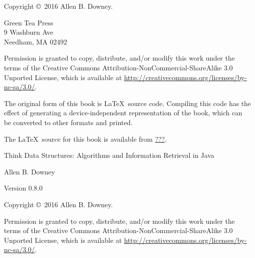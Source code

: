 \documentclass[12pt]{book}
\newcommand{\thetitle}{Think Data Structures}
\newcommand{\thesubtitle}{Algorithms and Information Retrieval in Java}
\newcommand{\theauthors}{Allen B. Downey}
\newcommand{\theversion}{0.8.0}
\theoremstyle{exercise}
\begin{document}
\begin{latexonly}
\newpage
\thispagestyle{empty}

Copyright \copyright ~2016 \theauthors.

\vspace{0.2in}

\begin{flushleft}
Green Tea Press \\
9 Washburn Ave \\
Needham, MA 02492
\end{flushleft}

Permission is granted to copy, distribute, and/or modify this work under the terms of the Creative Commons Attribution-NonCommercial-ShareAlike 3.0 Unported License, which is available at \url{http://creativecommons.org/licenses/by-nc-sa/3.0/}.

The original form of this book is \LaTeX\ source code.
Compiling this code has the effect of generating a device-independent representation of the book, which can be converted to other formats and printed.

The \LaTeX\ source for this book is available from
\url{???}.


\cleardoublepage
\setcounter{tocdepth}{1}
\tableofcontents

\end{latexonly}


\begin{htmlonly}

\vspace{1em}

{\Large \thetitle: \thesubtitle}

{\large \theauthors}

Version \theversion

\vspace{1em}

Copyright \copyright ~2016 \theauthors.

Permission is granted to copy, distribute, and/or modify this work under the terms of the Creative Commons Attribution-NonCommercial-ShareAlike 3.0 Unported License, which is available at \url{http://creativecommons.org/licenses/by-nc-sa/3.0/}.

\vspace{1em}

\end{htmlonly}
\end{document}
